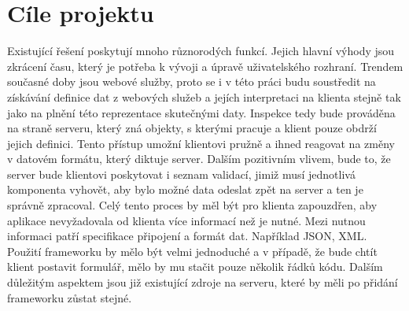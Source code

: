 \section{Cíle projektu}
Existující řešení poskytují mnoho různorodých funkcí. Jejich hlavní výhody jsou zkrácení času, který je potřeba k vývoji a úpravě uživatelského rozhraní. Trendem současné doby jsou webové služby, proto se i v této práci budu soustředit na získávání definice dat z webových služeb a jejích interpretaci na klienta stejně tak jako na plnění této reprezentace skutečnými daty. Inspekce tedy bude prováděna na straně serveru, který zná objekty, s kterými pracuje a klient pouze obdrží jejich definici. Tento přístup umožní klientovi pružně a ihned reagovat na změny v datovém formátu, který diktuje server. Dalším pozitivním vlivem, bude to, že server bude klientovi poskytovat i seznam validací, jimiž musí jednotlivá komponenta vyhovět, aby bylo možné data odeslat zpět na server a ten je správně zpracoval. Celý tento proces by měl být pro klienta zapouzdřen, aby aplikace nevyžadovala od klienta více informací než je nutné. Mezi nutnou informaci patří specifikace připojení a formát dat. Například JSON, XML. Použití frameworku by mělo být velmi jednoduché a v případě, že bude chtít klient postavit formulář, mělo by mu stačit pouze několik řádků kódu. Dalším důležitým aspektem jsou již existující zdroje na serveru, které by měli po přidání frameworku zůstat stejné. 